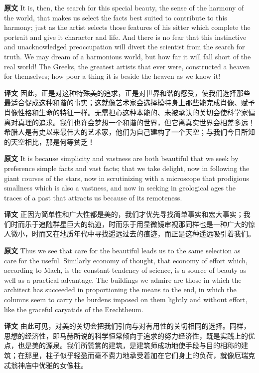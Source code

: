 \documentclass[UTF8]{ctexart}
\newenvironment{english}{\par\small\noindent\textbf{原文}\quad\ignorespaces}{\par}
\newenvironment{zhtranslation}{\par\noindent\textbf{译文}\quad\ignorespaces}{\par\vspace{0.35em}}
\begin{document}
\begin{english}
It is, then, the search for this special beauty, the sense of the harmony of the world, that makes us select the facts best suited to contribute to this harmony; just as the artist selects those features of his sitter which complete the portrait and give it character and life. And there is no fear that this instinctive and unacknowledged preoccupation will divert the scientist from the search for truth. We may dream of a harmonious world, but how far it will fall short of the real world! The Greeks, the greatest artists that ever were, constructed a heaven for themselves; how poor a thing it is beside the heaven as we know it!
\end{english}
\begin{zhtranslation}
因此，正是对这种特殊美的追求，正是对世界和谐的感受，使我们选择那些最适合促成这种和谐的事实；这就像艺术家会选择模特身上那些能完成肖像、赋予肖像性格和生命的特征一样。无需担心这种本能的、未被承认的关切会使科学家偏离对真理的追求。我们也许会梦想一个和谐的世界，但它离真实世界会相差多远！希腊人是有史以来最伟大的艺术家，他们为自己建构了一个天空；与我们今日所知的天空相比，那是何等贫乏！
\end{zhtranslation}

\begin{english}
It is because simplicity and vastness are both beautiful that we seek by preference simple facts and vast facts; that we take delight, now in following the giant courses of the stars, now in scrutinizing with a microscope that prodigious smallness which is also a vastness, and now in seeking in geological ages the traces of a past that attracts us because of its remoteness.
\end{english}
\begin{zhtranslation}
正因为简单性和广大性都是美的，我们才优先寻找简单事实和宏大事实；我们时而乐于追随群星巨大的轨道，时而乐于用显微镜审视那同样也是一种广大的惊人微小，时而又在地质年代中寻找遥远过去的痕迹，而正是这种遥远吸引着我们。\end{zhtranslation}

\begin{english}
Thus we see that care for the beautiful leads us to the same selection as care for the useful. Similarly economy of thought, that economy of effort which, according to Mach, is the constant tendency of science, is a source of beauty as well as a practical advantage. The buildings we admire are those in which the architect has succeeded in proportioning the means to the end, in which the columns seem to carry the burdens imposed on them lightly and without effort, like the graceful caryatids of the Erechtheum.
\end{english}
\begin{zhtranslation}
由此可见，对美的关切会把我们引向与对有用性的关切相同的选择。同样，思想的经济性，即马赫所说的科学恒常倾向于追求的努力经济性，既是实践上的优点，也是美的源泉。我们所赞赏的建筑，是建筑师成功地使手段与目的相称的建筑；在那里，柱子似乎轻盈而毫不费力地承受着加在它们身上的负荷，就像厄瑞克忒翁神庙中优雅的女像柱。\end{zhtranslation}
\end{document}
